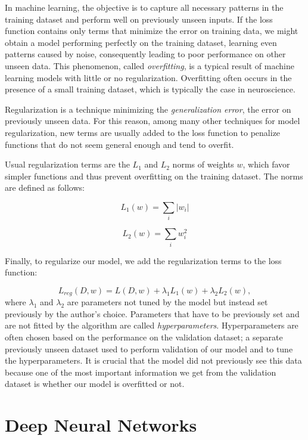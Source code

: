In machine learning, the objective is to capture all necessary patterns in the training dataset and perform well on previously unseen inputs. If the loss function contains only terms that minimize the error on training data, we might obtain a model performing perfectly on the training dataset, learning even patterns caused by noise, consequently leading to poor performance on other unseen data. This phenomenon, called \emph{overfitting}, is a typical result of machine learning models with little or no regularization. Overfitting often occurs in the presence of a small training dataset, which is typically the case in neuroscience.


Regularization is a technique minimizing the \emph{generalization error}, the error on previously unseen data. For this reason, among many other techniques for model regularization, new terms are usually added to the loss function to penalize functions that do not seem general enough and tend to overfit.

Usual regularization terms are the $L_1$ and $L_2$ norms of weights $w$, which favor simpler functions and thus prevent overfitting on the training dataset. The norms are defined as follows:

\begin{equation}
L_1(w) = \sum_i |w_i|
\end{equation}

\begin{equation}
L_2(w) = \sum_i w_i^2
\end{equation}

Finally, to regularize our model, we add the regularization terms to the loss function:

\begin{equation}
L_{reg}(D, w) = L(D, w) + \lambda_1 L_1(w) + \lambda_2 L_2(w),
\end{equation}
where $\lambda_1$ and $\lambda_2$ are parameters not tuned by the model but instead set previously by the author’s choice. Parameters that have to be previously set and are not fitted by the algorithm are called \emph{hyperparameters}. Hyperparameters are often chosen based on the performance on the validation dataset; a separate previously unseen dataset used to perform validation of our model and to tune the hyperparameters. It is crucial that the model did not previously see this data because one of the most important information we get from the validation dataset is whether our model is overfitted or not.


\section{Deep Neural Networks}

